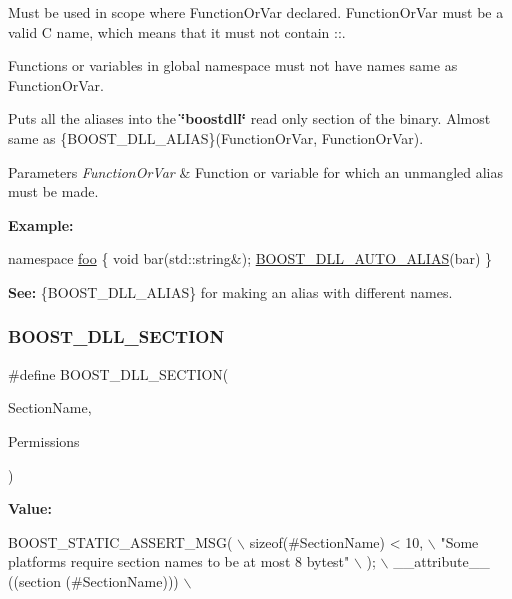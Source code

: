 Must be used in scope where Function\+Or\+Var declared. Function\+Or\+Var must be a valid C name, which means that it must not contain {\ttfamily \+:\+:}.

Functions or variables in global namespace must not have names same as Function\+Or\+Var.

Puts all the aliases into the {\bfseries \char`\"{}boostdll\char`\"{}} read only section of the binary. Almost same as \{B\+O\+O\+S\+T\+\_\+\+D\+L\+L\+\_\+\+A\+L\+I\+AS\}(Function\+Or\+Var, Function\+Or\+Var).


\begin{DoxyParams}{Parameters}
{\em Function\+Or\+Var} & Function or variable for which an unmangled alias must be made.\\
\hline
\end{DoxyParams}
{\bfseries Example\+:} 
\begin{DoxyCode}
\textcolor{keyword}{namespace }\hyperlink{a01792}{foo} \{
  \textcolor{keywordtype}{void} bar(std::string&);
  \hyperlink{a00200_af6db740861079eab68b0629d98d74cd8}{BOOST\_DLL\_AUTO\_ALIAS}(bar)
\}
\end{DoxyCode}


{\bfseries See\+:} \{B\+O\+O\+S\+T\+\_\+\+D\+L\+L\+\_\+\+A\+L\+I\+AS\} for making an alias with different names. \mbox{\label{a00200_a77c8964c8b614e76a662bb500babac74}} 
\subsubsection{\texorpdfstring{B\+O\+O\+S\+T\+\_\+\+D\+L\+L\+\_\+\+S\+E\+C\+T\+I\+ON}{BOOST\_DLL\_SECTION}}
{\footnotesize\ttfamily \#define B\+O\+O\+S\+T\+\_\+\+D\+L\+L\+\_\+\+S\+E\+C\+T\+I\+ON(\begin{DoxyParamCaption}\item[{}]{Section\+Name,  }\item[{}]{Permissions }\end{DoxyParamCaption})}

{\bfseries Value\+:}
\begin{DoxyCode}
BOOST\_STATIC\_ASSERT\_MSG(                                                                    \(\backslash\)
        \textcolor{keyword}{sizeof}(#SectionName) < 10,                                                              \(\backslash\)
        \textcolor{stringliteral}{"Some platforms require section names to be at most 8 bytest"}                           \(\backslash\)
    );                                                                                          \(\backslash\)
    \_\_attribute\_\_ ((section (#SectionName)))                                                    \(\backslash\)
\end{DoxyCode}


